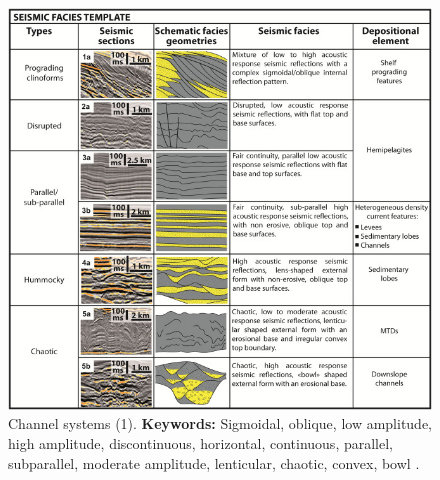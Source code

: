 \begin{figure}[h!]
    \centering
    \includegraphics[width=0.9\linewidth]{Figures/0.3Seismic/Thieblemont2020-1.jpg}
    \caption[Channel systems (1).]{Channel systems (1). \textbf{Keywords: }Sigmoidal, oblique, low amplitude, high amplitude, discontinuous, horizontal, continuous, parallel, subparallel, moderate amplitude, lenticular, chaotic, convex, bowl \citep{Thieblemont2020}.}
    \label{fig:Thieblemont2020-1}
\end{figure}

